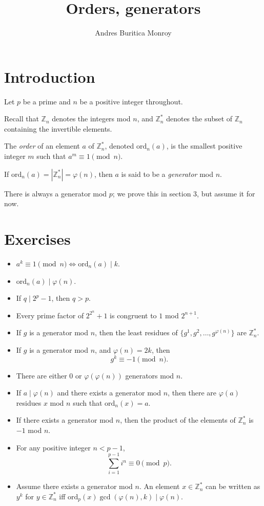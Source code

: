 \documentclass{article}
\title{Orders, generators}
\author{Andres Buritica Monroy}
\date{}
\newcommand\Zz{\mathbb{Z}}
\newcommand\ord{\mathrm{ord}}
\begin{document}
\maketitle
\section{Introduction}
  Let $p$ be a prime and $n$ be a positive integer throughout.

  Recall that $\Zz_n$ denotes the integers mod $n$, and $\Zz_n^*$ denotes the
  subset of $\Zz_n$ containing the invertible elements.

  The \emph{order} of an element $a$ of $\Zz_n^*$, denoted $\ord_n(a)$,
  is the smallest positive integer $m$ such that $a^m\equiv 1\pmod n$.

  If $\ord_n(a)=|\mathbb Z_n^*|=\varphi(n)$, then $a$ is said to be a
  \emph{generator} mod $n$.

  There is always a generator mod $p$; we prove this in section 3, but assume it for
  now.
\section{Exercises}
\begin{itemize}
  \item $a^k\equiv 1\pmod n \iff \ord_n(a)\mid k$.
  \item $\ord_n(a)\mid\varphi(n)$.
  \item If $q\mid 2^p-1$, then $q>p$.
  \item Every prime factor of $2^{2^n}+1$ is congruent to $1$ mod $2^{n+1}$.
  \item If $g$ is a generator mod $n$, then the least residues of
    $\{g^1,g^2,\ldots,g^{\varphi(n)}\}$ are $\Zz_n^*$.
  \item If $g$ is a generator mod $n$, and $\varphi(n)=2k$, then
    \[g^k\equiv -1\pmod n.\]
  \item There are either $0$ or $\varphi(\varphi(n))$ generators mod $n$.
  \item If $a\mid\varphi(n)$ and there exists a generator mod $n$, then 
    there are $\varphi(a)$ residues $x$ mod $n$ such that $\ord_n(x)=a$.
  \item If there exists a generator mod $n$, then the product of the elements of
    $\Zz_n^*$ is $-1$ mod $n$.
  \item For any positive integer $n<p-1$,
    \[\sum_{i=1}^{p-1} i^n\equiv 0\pmod p.\]
  \item Assume there exists a generator mod $n$.
    An element $x\in\Zz_n^*$ can be written as $y^k$ for $y\in\Zz_n^*$ iff
    $\ord_p(x)\gcd(\varphi(n),k)\mid \varphi(n)$.
\end{itemize}
\end{document}
